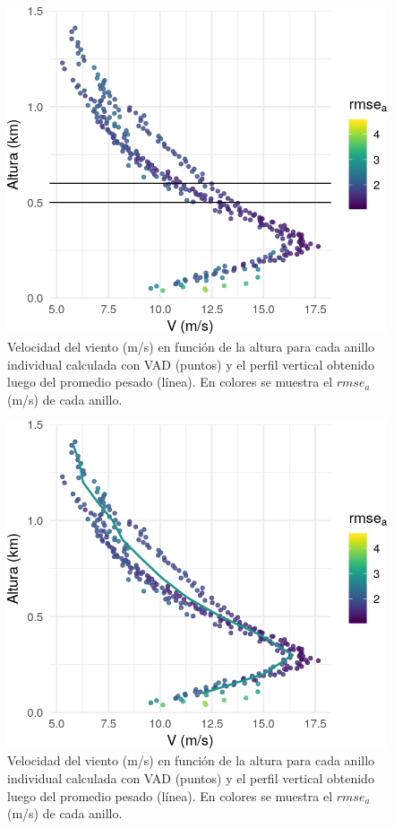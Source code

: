 \documentclass[12pt,spanish,oneside, a4paper]{book}
\begin{document}
\begin{figure}

{\centering \includegraphics{Defensa/Fig/evad-1} 

}

\caption{Velocidad del viento (m/s) en función de la altura para cada anillo individual calculada con VAD (puntos) y el perfil vertical obtenido luego del promedio pesado (línea). En colores se muestra el $rmse_a$ (m/s) de cada anillo. \label{perfil-rmse}}\label{fig:evad1}
\end{figure}\begin{figure}

{\centering \includegraphics{Defensa/Fig/evad-2} 

}

\caption{Velocidad del viento (m/s) en función de la altura para cada anillo individual calculada con VAD (puntos) y el perfil vertical obtenido luego del promedio pesado (línea). En colores se muestra el $rmse_a$ (m/s) de cada anillo. \label{perfil-rmse}}\label{fig:evad2}
\end{figure}
\end{document}
